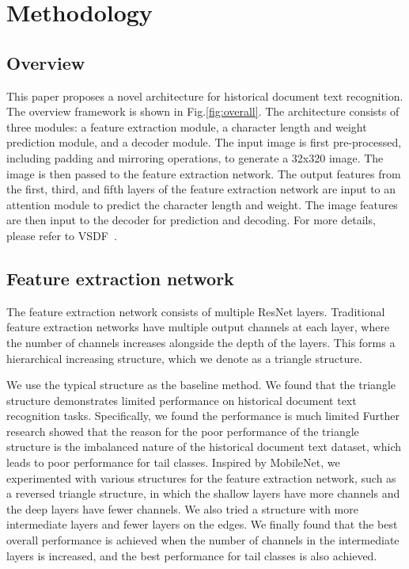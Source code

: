 \section{Methodology}

\subsection{Overview}
 

This paper proposes a novel architecture for historical document text recognition. The overview framework is shown in Fig.\ref{fig:overall}. The architecture consists of three modules: a feature extraction module, a character length and weight prediction module, and a decoder module. The input image is first pre-processed, including padding and mirroring operations, to generate a 32x320 image. The image is then passed to the feature extraction network. The output features from the first, third, and fifth layers of the feature extraction network are input to an attention module to predict the character length and weight. The image features are then input to the decoder for prediction and decoding. For more details, please refer to VSDF~\cite{vsdf}.

\subsection{Feature extraction network}

The feature extraction network consists of multiple ResNet layers. Traditional feature extraction networks have multiple output channels at each layer, where the number of channels increases alongside the depth of the layers. 
This forms a hierarchical increasing structure, which we denote as a triangle structure. 

We use the typical structure as the baseline method.
We found that the triangle structure demonstrates limited performance on historical document text recognition tasks. 
Specifically, we found the performance is much limited 
Further research showed that the reason for the poor performance of the triangle structure is the imbalanced nature of the historical document text dataset, which leads to poor performance for tail classes. Inspired by MobileNet, we experimented with various structures for the feature extraction network, such as a reversed triangle structure, in which the shallow layers have more channels and the deep layers have fewer channels. We also tried a structure with more intermediate layers and fewer layers on the edges. We finally found that the best overall performance is achieved when the number of channels in the intermediate layers is increased, and the best performance for tail classes is also achieved.


